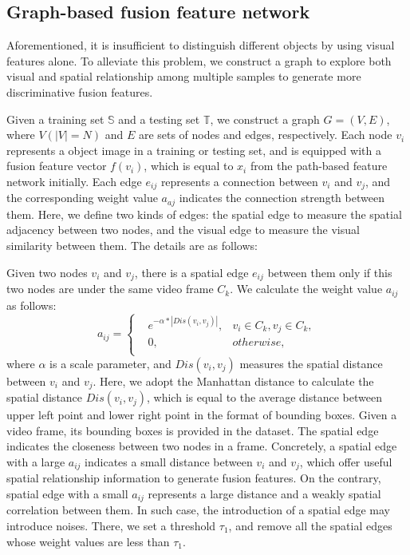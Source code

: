 \documentclass[10pt,twocolumn,letterpaper]{article}
\begin{document}
\subsection{Graph-based fusion feature network}
Aforementioned, it is insufficient to distinguish different objects by using visual features alone. 
To alleviate this problem, we construct a graph to explore both visual and spatial relationship among multiple samples to generate more discriminative fusion features.

Given a training set $\mathbb{S}$ and a testing set $\mathbb{T}$, we construct a graph $G=(V,E)$, where $V(|V|=N)$ and $E$ are sets of nodes and edges, respectively. 
Each node $v_i$ represents a object image in a training or testing set, and is equipped with a fusion feature vector $f(v_i)$, which is equal to $x_i$ from the path-based feature network initially.
Each edge $e_{ij}$ represents a connection between $v_i$ and $v_j$, and the corresponding weight value $a_{aj}$ indicates the connection strength between them.
Here, we define two kinds of edges: the spatial edge to measure the spatial adjacency between two nodes, and the visual edge to measure the visual similarity between them.
The details are as follows:

Given two nodes $v_i$ and $v_j$, there is a spatial edge $e_{ij}$ between them only if this two nodes are under the same video frame $C_k$. We calculate the weight value $a_{ij}$ as follows:
\begin{equation} \label{equ:weight_value}
a_{ij}=\left\{ \begin{aligned}
& e^{-\alpha*|Dis(v_i, v_j)|}, & v_i \in C_k, v_j \in C_k, \\
& 0, & otherwise, \\
\end{aligned} \right.
\end{equation}
where $\alpha$ is a scale parameter, and $Dis(v_i, v_j)$ measures the spatial distance between $v_i$ and $v_j$.
Here, we adopt the Manhattan distance to calculate the spatial distance $Dis(v_i, v_j)$, which is equal to the average distance between upper left point and lower right point in the format of bounding boxes.
Given a video frame, its bounding boxes is provided in the dataset.
The spatial edge indicates the closeness between two nodes in a frame. 
Concretely, a spatial edge with a large $a_{ij}$ indicates a small distance between $v_i$ and $v_j$, which offer useful spatial relationship information to generate fusion features. 
On the contrary, spatial edge with a small $a_{ij}$ represents a large distance and a weakly spatial correlation between them.
In such case, the introduction of a spatial edge may introduce noises.
There, we set a threshold $\tau_1$, and remove all the spatial edges whose weight values are less than $\tau_1$.
\end{document}
